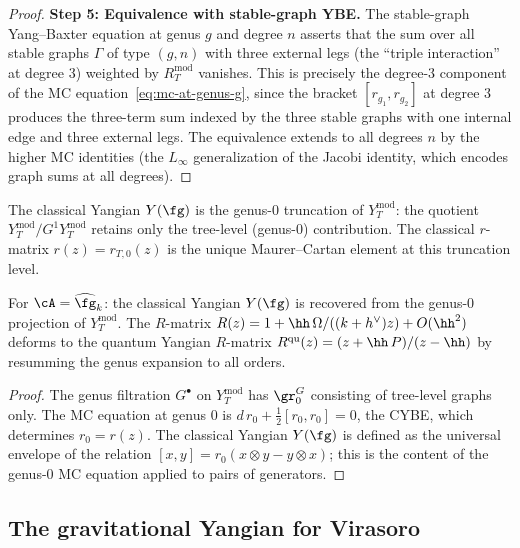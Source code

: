 \begin{proof}
\medskip
\noindent\textbf{Step 5: Equivalence with stable-graph YBE.}
The stable-graph Yang--Baxter equation at genus $g$ and degree $n$
asserts that the sum over all stable graphs $\Gamma$ of type
$(g, n)$ with three external legs (the ``triple interaction'' at
degree $3$) weighted by $R_T^{\mathrm{mod}}$ vanishes. This is
precisely the degree-$3$ component of the MC
equation~\eqref{eq:mc-at-genus-g}, since the bracket $[r_{g_1},
r_{g_2}]$ at degree $3$ produces the three-term sum indexed by
the three stable graphs with one internal edge and three
external legs. The equivalence extends to all degrees $n$
by the higher MC identities (the $L_\infty$ generalization of
the Jacobi identity, which encodes graph sums at all degrees).
\end{proof}

\begin{corollary}
The classical Yangian $Y(\fg)$ is the genus-$0$ truncation of
$Y_T^{\mathrm{mod}}$: the quotient
$Y_T^{\mathrm{mod}} / G^1 Y_T^{\mathrm{mod}}$ retains only the
tree-level (genus-$0$) contribution. The classical $r$-matrix
$r(z) = r_{T,0}(z)$ is the unique Maurer--Cartan element at this
truncation level.

For $\cA = \widehat{\fg}_k$: the classical Yangian $Y(\fg)$ is
recovered from the genus-$0$ projection of $Y_T^{\mathrm{mod}}$.
The $R$-matrix $R(z) = 1 + \hh\, \Omega/((k+h^\vee)z)
+ O(\hh^2)$ deforms to the quantum Yangian $R$-matrix
$R^{\mathrm{qu}}(z) = (z + \hh\,P)/(z - \hh)$ by resumming the
genus expansion to all orders.
\end{corollary}

\begin{proof}
The genus filtration $G^\bullet$ on $Y_T^{\mathrm{mod}}$ has
$\gr^G_0$ consisting of tree-level graphs only. The MC equation
at genus $0$ is $d\, r_0 + \frac{1}{2}[r_0, r_0] = 0$, the
CYBE, which determines $r_0 = r(z)$. The classical Yangian
$Y(\fg)$ is defined as the universal envelope of the relation
$[x, y] = r_0(x \otimes y - y \otimes x)$; this is the content
of the genus-$0$ MC equation applied to pairs of generators.
\end{proof}

\subsection{The gravitational Yangian for Virasoro}

